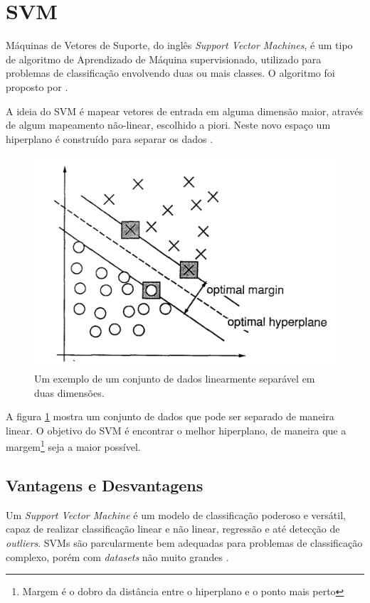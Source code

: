 \section{SVM}

Máquinas de Vetores de Suporte, do inglês \textit{Support Vector Machines}, é um tipo de algoritmo de Aprendizado de Máquina supervisionado, utilizado para problemas de classificação envolvendo duas ou mais classes. O algoritmo foi proposto por \cite{Cortes:1995}. 

A ideia do SVM é mapear vetores de entrada em alguma dimensão maior, através de algum mapeamento não-linear, escolhido a piori. Neste novo espaço um hiperplano é construído para separar os dados \cite{Cortes:1995}.

\begin{figure}[ht!]
    \centering
    \includegraphics[scale=0.70]{Imagens/svm-exemplo.png}
    \caption{Um exemplo de um conjunto de dados linearmente separável em duas dimensões. \cite{Cortes:1995}}
    \label{fig:svm-exemplo}
\end{figure}

A figura \ref{fig:svm-exemplo} mostra um conjunto de dados que pode ser separado de maneira linear. O objetivo do SVM é encontrar o melhor hiperplano, de maneira que a margem\footnote{Margem é o dobro da distância entre o hiperplano e o ponto mais perto} seja a maior possível. 

\subsection{Vantagens e Desvantagens}
Um \textit{Support Vector Machine} é um modelo de classificação poderoso e versátil, capaz de realizar classificação linear e não linear, regressão e até detecção de \textit{outliers}. SVMs são parcularmente bem adequadas para problemas de classificação complexo, porém com \textit{datasets} não muito grandes \cite{Geron:2017}.

